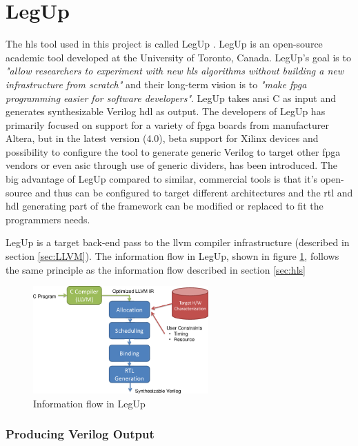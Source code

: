 \section{LegUp}

The \gls{hls} tool used in this project is called LegUp \cite{canis2011legup}. LegUp is an open-source academic tool developed at the University of Toronto, Canada. LegUp's goal is to \textit{"allow researchers to experiment with new \gls{hls} algorithms without building a new infrastructure from scratch"} and their long-term vision is to \textit{"make \gls{fpga} programming easier for software developers"}. LegUp takes \acrshort{ansi} C as input and generates synthesizable Verilog \gls{hdl} as output. The developers of LegUp has primarily focused on support for a variety of \gls{fpga} boards from manufacturer Altera, but in the latest version (4.0), beta support for Xilinx devices and possibility to configure the tool to generate generic Verilog to target other \gls{fpga} vendors or even \gls{asic} through use of generic dividers, has been introduced. The big advantage of LegUp compared to similar, commercial tools is that it's open-source and thus can be configured to target different architectures and the \gls{rtl} and \gls{hdl} generating part of the framework can be modified or replaced to fit the programmers needs.

LegUp is a target back-end pass to the \gls{llvm} compiler infrastructure (described in section \ref{sec:LLVM}).
The information flow in LegUp, shown in figure \ref{fig:legupflow}, follows the same principle as the information flow described in section \ref{sec:hls} 

\begin{figure}[hbpt]
\centering
\includegraphics[width=0.6\textwidth]{../figs/LegUpFlow.png}
\caption{\label{fig:legupflow}Information flow in LegUp}
\end{figure}

\subsubsection{Producing Verilog Output}

